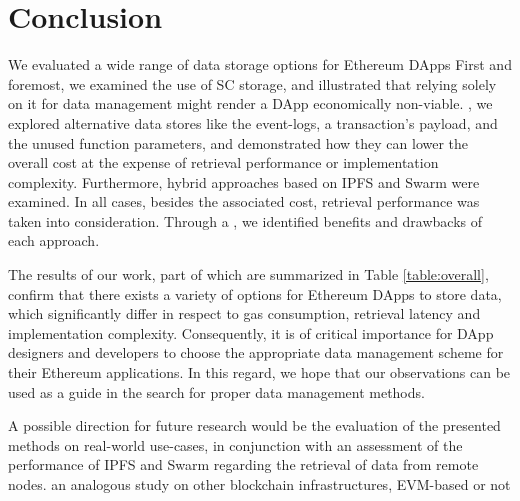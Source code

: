 \chapter{Conclusion}\label{chapter:Conclusion}
We evaluated a wide range of data storage options for Ethereum DApps  
First and foremost, we examined the use of SC storage, and illustrated that relying solely on it for data management might render a DApp economically non-viable. , we explored alternative data stores like the event-logs, a transaction’s payload, and the unused function parameters, and demonstrated how they can lower the overall cost at the expense of retrieval performance or implementation complexity. Furthermore, hybrid approaches based on IPFS and Swarm were examined. In all cases, besides the associated cost, retrieval performance was taken into consideration. Through a , we identified benefits and drawbacks of each approach. 




The results of our work, part of which are summarized in Table \ref{table:overall}, confirm that there exists a variety of options for Ethereum DApps to store data, which significantly differ in respect to gas consumption, retrieval latency and implementation complexity. Consequently, it is of critical importance for DApp designers and developers to choose the appropriate data management scheme for their Ethereum applications. In this regard, we hope that our observations can be used as a guide in the search for proper data management methods.


A possible direction for future research would be the evaluation of the presented methods on real-world use-cases, in conjunction with an assessment of the performance of IPFS and Swarm regarding the retrieval of data from remote nodes.  an analogous study on other blockchain infrastructures, EVM-based or not 